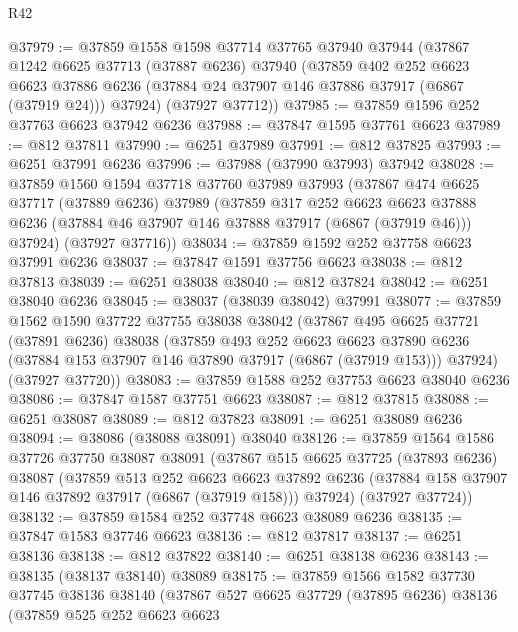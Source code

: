 \begin{lexlean}{R42}
\begin{coremodule}
{@37979 := @37859
    @1558
    @1598
    @37714
    @37765
    @37940
    @37944
    (@37867
      @1242
      @6625
      @37713
      (@37887 @6236)
      @37940
      (@37859
        @402
        @252
        @6623
        @6623
        @37886
        @6236
        (@37884 @24 @37907 @146 @37886 @37917 (@6867 (@37919 @24)))
        @37924)
      (@37927 @37712))
@37985 := @37859 @1596 @252 @37763 @6623 @37942 @6236
@37988 := @37847 @1595 @37761 @6623
@37989 := @812 @37811
@37990 := @6251 @37989
@37991 := @812 @37825
@37993 := @6251 @37991 @6236
@37996 := @37988 (@37990 @37993) @37942
@38028 := @37859
    @1560
    @1594
    @37718
    @37760
    @37989
    @37993
    (@37867
      @474
      @6625
      @37717
      (@37889 @6236)
      @37989
      (@37859
        @317
        @252
        @6623
        @6623
        @37888
        @6236
        (@37884 @46 @37907 @146 @37888 @37917 (@6867 (@37919 @46)))
        @37924)
      (@37927 @37716))
@38034 := @37859 @1592 @252 @37758 @6623 @37991 @6236
@38037 := @37847 @1591 @37756 @6623
@38038 := @812 @37813
@38039 := @6251 @38038
@38040 := @812 @37824
@38042 := @6251 @38040 @6236
@38045 := @38037 (@38039 @38042) @37991
@38077 := @37859
    @1562
    @1590
    @37722
    @37755
    @38038
    @38042
    (@37867
      @495
      @6625
      @37721
      (@37891 @6236)
      @38038
      (@37859
        @493
        @252
        @6623
        @6623
        @37890
        @6236
        (@37884 @153 @37907 @146 @37890 @37917 (@6867 (@37919 @153)))
        @37924)
      (@37927 @37720))
@38083 := @37859 @1588 @252 @37753 @6623 @38040 @6236
@38086 := @37847 @1587 @37751 @6623
@38087 := @812 @37815
@38088 := @6251 @38087
@38089 := @812 @37823
@38091 := @6251 @38089 @6236
@38094 := @38086 (@38088 @38091) @38040
@38126 := @37859
    @1564
    @1586
    @37726
    @37750
    @38087
    @38091
    (@37867
      @515
      @6625
      @37725
      (@37893 @6236)
      @38087
      (@37859
        @513
        @252
        @6623
        @6623
        @37892
        @6236
        (@37884 @158 @37907 @146 @37892 @37917 (@6867 (@37919 @158)))
        @37924)
      (@37927 @37724))
@38132 := @37859 @1584 @252 @37748 @6623 @38089 @6236
@38135 := @37847 @1583 @37746 @6623
@38136 := @812 @37817
@38137 := @6251 @38136
@38138 := @812 @37822
@38140 := @6251 @38138 @6236
@38143 := @38135 (@38137 @38140) @38089
@38175 := @37859
    @1566
    @1582
    @37730
    @37745
    @38136
    @38140
    (@37867
      @527
      @6625
      @37729
      (@37895 @6236)
      @38136
      (@37859
        @525
        @252
        @6623
        @6623
}
\end{coremodule}
\end{lexlean}

